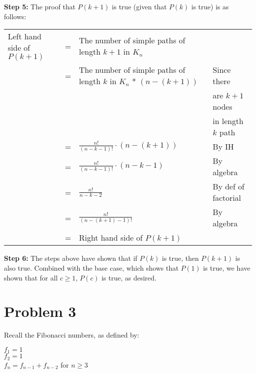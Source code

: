 \documentclass{article}
\begin{document}
\textbf{Step 5:} The proof that $P(k+1)$ is true (given that $P(k)$ is true) is as follows:\vspace{15pt}


\begin{adjustwidth}{-2cm}{}
	\begin{sloppypar}
		\begin{tabular}{l l l l}
			Left hand side of $P(k+1)$ & = & The number of simple paths of length $k+1$ in $K_n$ & \\
									   & = & The number of simple paths of length $k$ in $K_n$ * $(n-(k+1))$ & Since there \\
									   &  & & are $k+1$ nodes \\
									   & & & in length $k$ path \\
									   & = & $\frac{n!}{(n-k-1)!}\cdot (n-(k+1))$ & By IH \\
									   & = & $\frac{n!}{(n-k-1)!}\cdot(n-k-1)$ & By algebra \\
									   & = & $\frac{n!}{n-k-2}$ & By def of factorial \\
									   & = & $\frac{n!}{(n-(k+1)-1)!}$ & By algebra \\
									   & = & Right hand side of $P(k+1)$ & \\
		\end{tabular}
	\end{sloppypar}
\end{adjustwidth}
\vspace{15pt}

\textbf{Step 6:} The steps above have shown that if $P(k)$ is true, then $P(k+1)$ is also true. Combined with the base case, which shows that $P(1)$ is true, we have shown that for all $c\geq 1$, $P(c)$ is true, as desired.



\pagebreak

\section{Problem 3}

Recall the Fibonacci numbers, as defined by:
\begin{center}
    \begin{minipage}{0.5\textwidth} %
        \raggedright %
        $f_1=1$ \\
        $f_2=1$ \\
        $f_n=f_{n-1}+f_{n-2}$ for $n\geq 3$
    \end{minipage}
\end{center}
\vspace{10pt}
\end{document}
